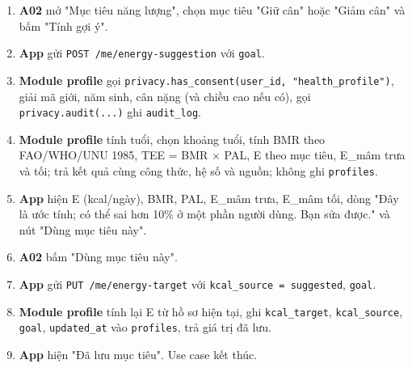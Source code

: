 \begin{enumerate}
\item \textbf{A02} mở "Mục tiêu năng lượng", chọn mục tiêu "Giữ cân" hoặc "Giảm cân" và bấm "Tính gợi ý".
\item \textbf{App} gửi {\small\texttt{POST /\allowbreak{}\allowbreak{}me/\allowbreak{}\allowbreak{}energy-\allowbreak{}suggestion}} với {\small\texttt{goal}}.
\item \textbf{Module profile} gọi {\small\texttt{privacy.\allowbreak{}has\_\allowbreak{}\allowbreak{}consent(user\_\allowbreak{}\allowbreak{}id, "health\_\allowbreak{}\allowbreak{}profile")}}, giải mã giới, năm sinh, cân nặng (và chiều cao nếu có), gọi {\small\texttt{privacy.\allowbreak{}audit(.\allowbreak{}.\allowbreak{}.\allowbreak{})}} ghi {\small\texttt{audit\_\allowbreak{}\allowbreak{}log}}.
\item \textbf{Module profile} tính tuổi, chọn khoảng tuổi, tính BMR theo FAO/\allowbreak{}WHO/\allowbreak{}UNU 1985, TEE = BMR \ensuremath{\times} PAL, E theo mục tiêu, E\_\allowbreak{}mâm trưa và tối; trả kết quả cùng công thức, hệ số và nguồn; không ghi {\small\texttt{profiles}}.
\item \textbf{App} hiện E (kcal/\allowbreak{}ngày), BMR, PAL, E\_\allowbreak{}mâm trưa, E\_\allowbreak{}mâm tối, dòng "Đây là ước tính; có thể sai hơn 10\% ở một phần người dùng. Bạn sửa được." và nút "Dùng mục tiêu này".
\item \textbf{A02} bấm "Dùng mục tiêu này".
\item \textbf{App} gửi {\small\texttt{PUT /\allowbreak{}\allowbreak{}me/\allowbreak{}\allowbreak{}energy-\allowbreak{}target}} với {\small\texttt{kcal\_\allowbreak{}\allowbreak{}source = suggested}}, {\small\texttt{goal}}.
\item \textbf{Module profile} tính lại E từ hồ sơ hiện tại, ghi {\small\texttt{kcal\_\allowbreak{}\allowbreak{}target}}, {\small\texttt{kcal\_\allowbreak{}\allowbreak{}source}}, {\small\texttt{goal}}, {\small\texttt{updated\_\allowbreak{}\allowbreak{}at}} vào {\small\texttt{profiles}}, trả giá trị đã lưu.
\item \textbf{App} hiện "Đã lưu mục tiêu". Use case kết thúc.
\end{enumerate}
